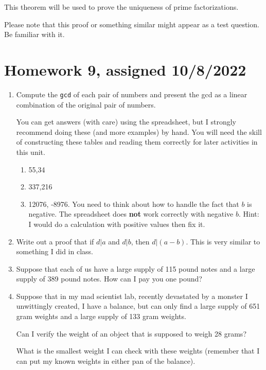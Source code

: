 \documentclass[12pt]{article}
\begin{document}
This theorem will be used to prove the uniqueness of prime factorizations.

Please note that this proof or something similar might appear as a test question.  Be familiar with it.

\section{Homework 9, assigned 10/8/2022}

\begin{enumerate}

\item  Compute the {\tt gcd} of each pair  of numbers and present the gcd as a linear combination of the original pair of numbers.

You can get answers (with care) using the spreadsheet, but I strongly recommend doing these (and more examples) by hand.  You will need the skill of constructing these tables and reading them correctly for later activities in this unit.

\begin{enumerate}

\item  55,34

\item 337,216

\item 12076, -8976.  You need to think about how to handle the fact that $b$ is negative.  The spreadsheet does {\bf not} work correctly with negative $b$.  Hint:  I would do a calculation with positive values then fix it.

\end{enumerate}

\item  Write out a proof that if $d|a$ and $d|b$, then $d|(a-b)$.  This is very similar to something I did in class.

\item  Suppose that each of us have a large supply of 115 pound notes and a large supply of 389 pound notes.
How can I pay you one pound?

\item  Suppose that in my mad scientist lab, recently devastated by a monster I unwittingly created, I have a balance, but can only find a large supply of 651 gram weights and a large supply of 133 gram weights.

Can I verify the weight of an object that is supposed to weigh 28 grams?

What is the smallest weight I can check with these weights (remember that I can put my known weights in either pan of the balance).

\end{enumerate}
\end{document}
